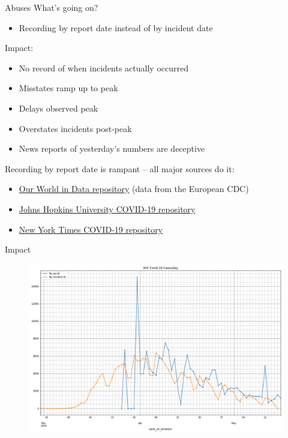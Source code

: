\documentclass[aspectratio=169]{beamer}
\begin{document}
\begin{frame}{Abuses}
  What's going on?
  \begin{itemize}
  \item Recording by report date instead of by incident date
  \end{itemize}
  
  Impact:
  \begin{itemize}
  \item No record of when incidents actually occurred
  \item Misstates ramp up to peak
  \item Delays observed peak
  \item Overstates incidents post-peak
  \item News reports of yesterday's numbers are deceptive
  \end{itemize}

  Recording by report date is rampant -- all major sources do it:
  \begin{itemize}
  \item \href{https://github.com/owid/covid-19-data}{Our World in Data
    repository} (data from the European CDC)
  \item \href{https://github.com/CSSEGISandData/COVID-19}{Johns Hopkins
    University COVID-19 repository}
  \item \href{https://github.com/nytimes/covid-19-data}{New York Times
    COVID-19 repository}
  \end{itemize}
\end{frame}

\begin{frame}{Impact}
  \begin{figure}
    \centering
    \includegraphics[height=.8\textheight]{../Notebooks/casesPerDayHistoryRptDtVsInDtRaw.png}
  \end{figure}
\end{frame}
\end{document}
